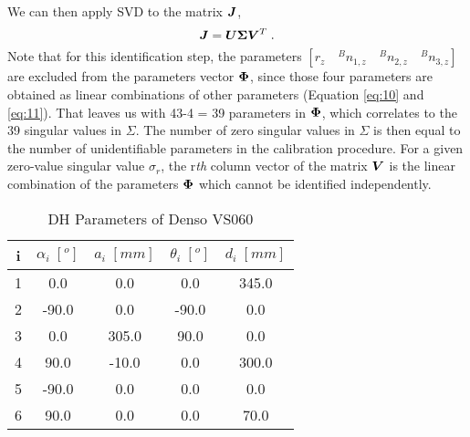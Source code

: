 We can then apply SVD to the matrix $\vb*{J}$,
\begin{equation}
 \vb*{J} = \vb*{U}\vb*{\Sigma}\vb*{V}^T \; .
\end{equation}
Note that for this identification step, the parameters $[r_z \quad {^B}n_{1,z}\quad {^B}n_{2,z}\quad {^B}n_{3,z}]$ are excluded from the parameters vector $\vb*{\Phi}$, since those four parameters are obtained as linear combinations of other parameters (Equation \eqref{eq:10} and \eqref{eq:11}). That leaves us with 43-4 = 39 parameters in $\vb*{\Phi}$, which correlates to the 39 singular values in $\Sigma$. The number of zero singular values in $\Sigma$ is then equal to the number of unidentifiable parameters in the calibration procedure. For a given zero-value singular value $\sigma_r$, the r\textit{th} column vector of the matrix $\vb*{V}$ is the linear combination of the parameters $\vb*{\Phi}$ which cannot be identified independently. 


\renewcommand{\arraystretch}{1.5}
\begin{table}[t]
\caption{DH Parameters of Denso VS060}
\label{tab:dh_params}
\centering
\begin{tabular}{c c c c c}
\toprule
i &  \textbf{$\alpha_i \;[^o]$} & \textbf{$a_i \;[mm]$} &  \textbf{$\theta_i \;[^o]$}  & \textbf{$d_i \;[mm]$}\\
\midrule
1 & 0.0 & 0.0 & 0.0 & 345.0\\
2 & -90.0 & 0.0 & -90.0 & 0.0\\
3 & 0.0 & 305.0 & 90.0 & 0.0\\
4 & 90.0 & -10.0 & 0.0 & 300.0\\
5 & -90.0 & 0.0 & 0.0 & 0.0\\
6 & 90.0 & 0.0 & 0.0 & 70.0\\
\bottomrule
\end{tabular}
\end{table}

